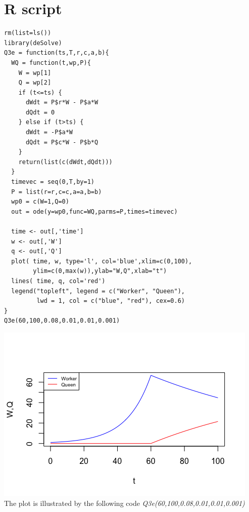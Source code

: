 \documentclass{article}
\begin{document}
\section{R script}
\begin{verbatim}
rm(list=ls())
library(deSolve)
Q3e = function(ts,T,r,c,a,b){
  WQ = function(t,wp,P){
    W = wp[1]
    Q = wp[2]
    if (t<=ts) {
      dWdt = P$r*W - P$a*W
      dQdt = 0
    } else if (t>ts) {
      dWdt = -P$a*W
      dQdt = P$c*W - P$b*Q
    }
    return(list(c(dWdt,dQdt)))
  }
  timevec = seq(0,T,by=1)
  P = list(r=r,c=c,a=a,b=b)
  wp0 = c(W=1,Q=0)
  out = ode(y=wp0,func=WQ,parms=P,times=timevec)
  
  time <- out[,'time']
  w <- out[,'W']
  q <- out[,'Q']
  plot( time, w, type='l', col='blue',xlim=c(0,100),
        ylim=c(0,max(w)),ylab="W,Q",xlab="t")
  lines( time, q, col='red')
  legend("topleft", legend = c("Worker", "Queen"),
         lwd = 1, col = c("blue", "red"), cex=0.6)
}
Q3e(60,100,0.08,0.01,0.01,0.001)
\end{verbatim}
\includegraphics[width=\textwidth]{images/3e.png}
The plot is illustrated by the following code \textit{Q3e(60,100,0.08,0.01,0.01,0.001)}
\end{document}
